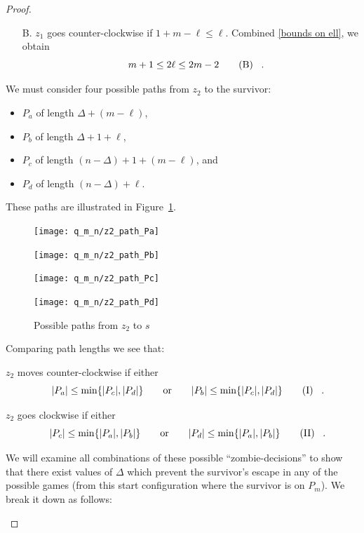 \begin{proof}
\begin{proofpart}
\begin{itemize}
   \item[B.] $z_1$ goes counter-clockwise if $1 + m - \ell \leq \ell$.
         Combined \ref{bounds on ell}, we obtain
         \begin{equation}
           m + 1 \leq 2 \ell \leq 2m - 2 \tag{B} \label{assumption b} \mperiod
         \end{equation}

  \end{itemize}

  We must consider four possible paths from $z_2$ to the survivor:

  \begin{itemize}
   \item $P_a$ of length $\Delta + (m - \ell)$,
   \item $P_b$ of length $\Delta + 1 + \ell$,
   \item $P_c$ of length $(n-\Delta) + 1 + (m-\ell)$, and
   \item $P_d$ of length $(n-\Delta) + \ell$.
  \end{itemize}

  These paths are illustrated in Figure~\ref{fig:different_paths}.

  \begin{figure}
    \centering
    \texttt{[image: q\_m\_n/z2\_path\_Pa]}

    \texttt{[image: q\_m\_n/z2\_path\_Pb]}

    \texttt{[image: q\_m\_n/z2\_path\_Pc]}

    \texttt{[image: q\_m\_n/z2\_path\_Pd]}

    \caption{Possible paths from $z_2$ to $s$ \label{fig:different_paths}}
  \end{figure}

  Comparing path lengths we see that:

  $z_2$ moves counter-clockwise if either
   \[ |P_a| \leq \min \{ |P_c|, |P_d| \}\qquad \text{or} \qquad |P_b| \leq \min \{ |P_c|, |P_d| \} \tag{I} \label{assumption i} \mperiod \]

  $z_2$ goes clockwise if either
   \[ |P_c| \leq \min \{ |P_a|, |P_b| \}\qquad \text{or} \qquad |P_d| \leq \min \{ |P_a|, |P_b| \} \tag{II} \label{assumption ii}\mperiod \]

  We will examine all combinations of these possible ``zombie-decisions'' to show that there exist values of $\Delta$ which prevent the survivor's escape in any of the possible games (from this start configuration where the survivor is on $P_m$). We break it down as follows:


\end{proofpart}
\end{proof}
